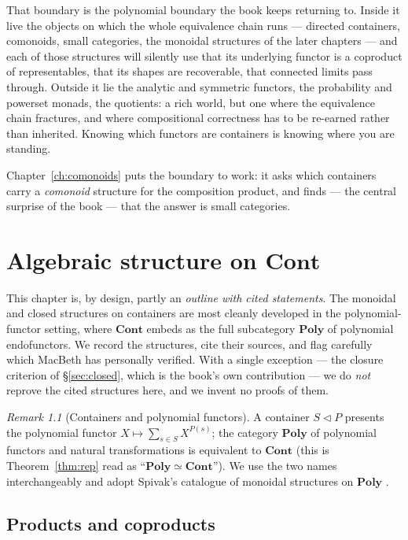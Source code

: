 \documentclass[11pt,a4paper]{book}
\newcommand{\Cont}{\mathbf{Cont}}
\newcommand{\Poly}{\mathbf{Poly}}
\newcommand{\cont}[2]{#1 \triangleleft #2}
\theoremstyle{plain}
\theoremstyle{definition}
\theoremstyle{remark}
\newtheorem{Remark}[Theorem]{Remark}
\begin{document}
That boundary is the polynomial boundary the book keeps returning to. Inside it live
the objects on which the whole equivalence chain runs --- directed containers,
comonoids, small categories, the monoidal structures of the later chapters --- and
each of those structures will silently use that its underlying functor is a
coproduct of representables, that its shapes are recoverable, that connected limits
pass through. Outside it lie the analytic and symmetric functors, the probability
and powerset monads, the quotients: a rich world, but one where the equivalence
chain fractures, and where compositional correctness has to be re-earned rather than
inherited. Knowing which functors are containers is knowing where you are standing.

Chapter~\ref{ch:comonoids} puts the boundary to work: it asks which containers carry
a \emph{comonoid} structure for the composition product, and finds --- the central
surprise of the book --- that the answer is small categories.

\chapter{Algebraic structure on \texorpdfstring{$\Cont$}{Cont}}
\label{ch:algebra}

This chapter is, by design, partly an \emph{outline with cited statements}. The
monoidal and closed structures on containers are most cleanly developed in the
polynomial-functor setting, where $\Cont$ embeds as the full subcategory $\Poly$
of polynomial endofunctors. We record the structures, cite their sources, and
flag carefully which MacBeth has personally verified. With a single exception ---
the closure criterion of §\ref{sec:closed}, which is the book's own contribution
--- we do \emph{not} reprove the cited structures here, and we invent no proofs of
them.

\begin{Remark}[Containers and polynomial functors]
A container $\cont SP$ presents the polynomial functor
$X\mapsto\sum_{s\in S}X^{P(s)}$; the category $\Poly$ of polynomial functors and
natural transformations is equivalent to $\Cont$ (this is
Theorem~\ref{thm:rep} read as ``$\Poly\simeq\Cont$''). We use the two names
interchangeably and adopt Spivak's catalogue of monoidal structures on $\Poly$
\cite{Spivak21}.
\end{Remark}

\section{Products and coproducts}
\end{document}
